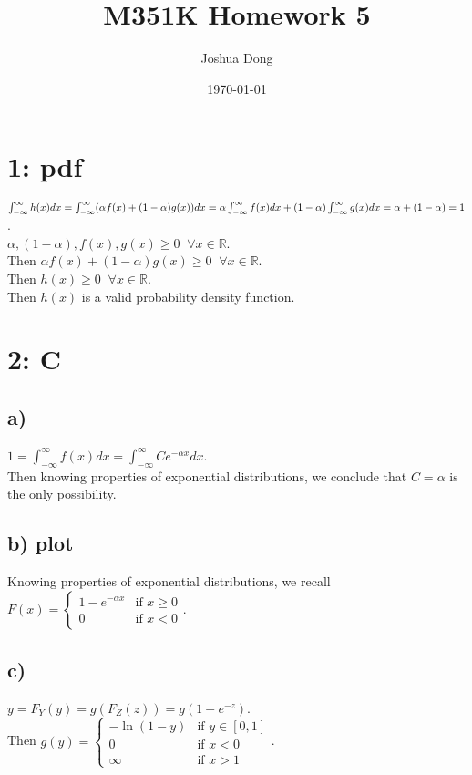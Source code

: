 \documentclass{article}
\begin{document}
\title{\vspace{-60px}M351K\: Homework 5}
\author{Joshua Dong}
\date{\today}
\maketitle

\section*{1: pdf}
$\int_{-\infty}^{\infty}h(x)dx
\\= \int_{-\infty}^{\infty}(\alpha f(x) + (1 - \alpha) g(x))dx
\\= \alpha\int_{-\infty}^{\infty}f(x)dx
+ (1 - \alpha)\int_{-\infty}^{\infty} g(x)dx
\\= \alpha + (1 - \alpha)
\\= 1
$.
\\$\alpha, (1 - \alpha), f(x), g(x) \ge 0 \;\; \forall x \in \mathbb{R}$.
\\Then $\alpha f(x) + (1 - \alpha)g(x) \ge 0 \;\; \forall x \in \mathbb{R}$.
\\Then $h(x) \ge 0 \;\; \forall x \in \mathbb{R}$.
\\Then $h(x)$ is a valid probability density function.

\section*{2: C}
\subsection*{a)}
$1 = \int_{-\infty}^{\infty}f(x)dx = \int_{-\infty}^{\infty}Ce^{-\alpha x}dx$.
\\Then knowing properties of exponential distributions, we conclude that
$C = \alpha$ is the only possibility.
\subsection*{b) plot}
Knowing properties of exponential distributions, we recall
\\$
F(x) = 
\begin{cases}
    1 - e^{-\alpha x} & \text{if }x \ge 0 \\
    0 & \text{if } x < 0
\end{cases}
$.
\subsection*{c)}
$y = F_Y(y) = g(F_Z(z)) = g(1 - e^{-z})$.
\\Then $g(y) =
\begin{cases}
    -\ln{(1-y)} & \text{if } y \in [0, 1] \\
    0 & \text{if } x < 0\\
    \infty & \text{if } x > 1
\end{cases}
$.
\end{document}
